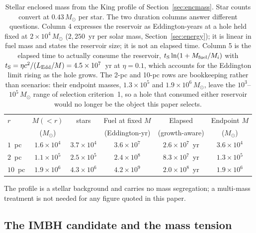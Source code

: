 \documentclass[11pt]{article}
\newcommand{\msun}{\ensuremath{M_\odot}}
\begin{document}
\begin{table}[tbp]
\centering
\small
\caption{Stellar enclosed mass from the King profile of
Section~\ref{sec:encmass}. Star counts convert at $0.43\,\msun$ per star.
The two duration columns answer different questions. Column 4 expresses the reservoir as Eddington-years
at a hole held fixed at $2\times10^{4}\,\msun$ ($2{,}250$~yr per solar mass,
Section~\ref{sec:energy}); it is linear in fuel mass and states the reservoir size; it is not an elapsed time. Column 5 is the elapsed time to
actually consume the reservoir, $t_{\rm S}\ln(1 + M_{\rm fuel}/M_i)$ with
$t_{\rm S} = \eta c^{2}/(L_{\rm Edd}/M) = 4.5\times10^{7}$~yr at
$\eta = 0.1$, which accounts for the Eddington limit rising as the hole
grows. The 2-pc and 10-pc rows are bookkeeping rather than scenarios: their
endpoint masses, $1.3\times10^{5}$ and $1.9\times10^{6}\,\msun$, leave the
$10^{3}$--$10^{5}\,\msun$ range of selection criterion~1, so a hole that
consumed either reservoir would no longer be the object this paper
selects.}
\label{tab:encmass}
\footnotesize
\begin{tabular}{lccccc}
\toprule
$r$ & $M(<r)$ & stars & Fuel at fixed $M$ & Elapsed & Endpoint $M$ \\
 & ($\msun$) & & (Eddington-yr) & (growth-aware) & ($\msun$) \\
\midrule
$1$~pc & $1.6\times10^{4}$ & $3.7\times10^{4}$ & $3.6\times10^{7}$ & $2.6\times10^{7}$~yr & $3.6\times10^{4}$ \\
$2$~pc & $1.1\times10^{5}$ & $2.5\times10^{5}$ & $2.4\times10^{8}$ & $8.3\times10^{7}$~yr & $1.3\times10^{5}$ \\
$10$~pc & $1.9\times10^{6}$ & $4.3\times10^{6}$ & $4.2\times10^{9}$ & $2.0\times10^{8}$~yr & $1.9\times10^{6}$ \\
\bottomrule
\end{tabular}
\end{table}

The profile is a stellar background and carries no mass segregation; a
multi-mass treatment is not needed for any figure quoted in this paper.


\subsection{The IMBH candidate and the mass tension}
\label{sec:tension}
\end{document}
